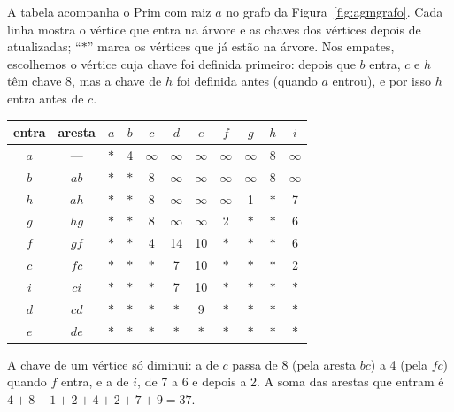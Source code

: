 \begin{exemplo}\label{ex:primchaves}
A tabela acompanha o Prim com raiz $a$ no grafo da Figura~\ref{fig:agmgrafo}. Cada linha mostra o vértice que entra na árvore e as chaves dos vértices depois de atualizadas; ``$\ast$'' marca os vértices que já estão na árvore. Nos empates, escolhemos o vértice cuja chave foi definida primeiro: depois que $b$ entra, $c$ e $h$ têm chave 8, mas a chave de $h$ foi definida antes (quando $a$ entrou), e por isso $h$ entra antes de $c$.
\begin{center}\small
\begin{tabular}{@{}cc|ccccccccc@{}}
\toprule
entra & aresta & $a$ & $b$ & $c$ & $d$ & $e$ & $f$ & $g$ & $h$ & $i$\\
\midrule
$a$ & --- & $\ast$ & 4 & $\infty$ & $\infty$ & $\infty$ & $\infty$ & $\infty$ & 8 & $\infty$\\
$b$ & $ab$ & $\ast$ & $\ast$ & 8 & $\infty$ & $\infty$ & $\infty$ & $\infty$ & 8 & $\infty$\\
$h$ & $ah$ & $\ast$ & $\ast$ & 8 & $\infty$ & $\infty$ & $\infty$ & 1 & $\ast$ & 7\\
$g$ & $hg$ & $\ast$ & $\ast$ & 8 & $\infty$ & $\infty$ & 2 & $\ast$ & $\ast$ & 6\\
$f$ & $gf$ & $\ast$ & $\ast$ & 4 & 14 & 10 & $\ast$ & $\ast$ & $\ast$ & 6\\
$c$ & $fc$ & $\ast$ & $\ast$ & $\ast$ & 7 & 10 & $\ast$ & $\ast$ & $\ast$ & 2\\
$i$ & $ci$ & $\ast$ & $\ast$ & $\ast$ & 7 & 10 & $\ast$ & $\ast$ & $\ast$ & $\ast$\\
$d$ & $cd$ & $\ast$ & $\ast$ & $\ast$ & $\ast$ & 9 & $\ast$ & $\ast$ & $\ast$ & $\ast$\\
$e$ & $de$ & $\ast$ & $\ast$ & $\ast$ & $\ast$ & $\ast$ & $\ast$ & $\ast$ & $\ast$ & $\ast$\\
\bottomrule
\end{tabular}
\end{center}
A chave de um vértice só diminui: a de $c$ passa de 8 (pela aresta $bc$) a 4 (pela $fc$) quando $f$ entra, e a de $i$, de 7 a 6 e depois a 2. A soma das arestas que entram é $4+8+1+2+4+2+7+9=37$.
\end{exemplo}

